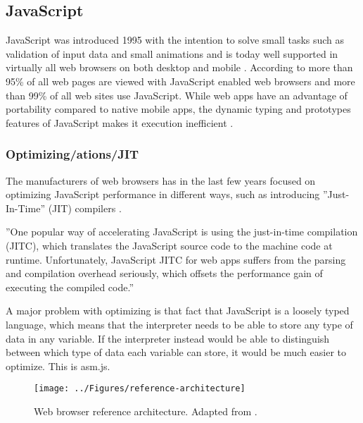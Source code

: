 \subsection{JavaScript}

JavaScript was introduced 1995 with the intention to solve small tasks such as validation of input data and small animations \parencite{Moller2018} and is today well supported in virtually all web browsers on both desktop and mobile \parencite{Zakai2011}. According to \textcite{TiwariSolihin2012} more than 95\% of all web pages are viewed with JavaScript enabled web browsers and more than 99\% of all web sites use JavaScript. While web apps have an advantage of portability compared to native mobile apps, the dynamic typing and prototypes features of JavaScript makes it execution inefficient \parencite{ParkJungMoon2015}.

\subsubsection*{Optimizing/ations/JIT}

The manufacturers of web browsers has in the last few years focused on optimizing JavaScript performance in different ways, such as introducing ''Just-In-Time'' (JIT) compilers \parencite{HerreraChenLavoieHendren2018}.



''One popular way of accelerating JavaScript is using the just-in-time compilation (JITC), which translates the JavaScript source code to the machine code at runtime. Unfortunately, JavaScript JITC for web apps suffers from the parsing and compilation overhead seriously, which offsets the performance gain of executing the compiled code.'' \parencite{ParkJungMoon2015}


A major problem with optimizing is that fact that JavaScript is a loosely typed language, which means that the interpreter needs to be able to store any type of data in any variable. If the interpreter instead would be able to distinguish between which type of data each variable can store, it would be much easier to optimize. This is asm.js.

\clearpage

\begin{figure}[!h]
\centering
\texttt{[image: ../Figures/reference-architecture]}
\caption{Web browser reference architecture. Adapted from \textcite{GrosskurthGodfrey2005}.}
\label{reference-architecture}
\end{figure}

